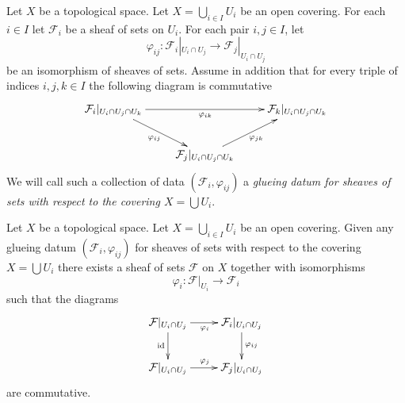 \medskip\noindent
Let $X$ be a topological space.
Let $X = \bigcup_{i\in I} U_i$ be an open covering.
For each $i \in I$ let $\mathcal{F}_i$ be a sheaf of sets on $U_i$.
For each pair $i, j \in I$, let
$$
\varphi_{ij} :
\mathcal{F}_i|_{U_i \cap U_j}
\longrightarrow
\mathcal{F}_j|_{U_i \cap U_j}
$$
be an isomorphism of sheaves of sets. Assume in addition
that for every triple of indices $i, j, k \in I$ the
following diagram is commutative
$$
\xymatrix{
\mathcal{F}_i|_{U_i \cap U_j \cap U_k}
\ar[rr]_{\varphi_{ik}}
\ar[rd]_{\varphi_{ij}} & &
\mathcal{F}_k|_{U_i \cap U_j \cap U_k} \\
&
\mathcal{F}_j|_{U_i \cap U_j \cap U_k}
\ar[ru]_{\varphi_{jk}}
}
$$
We will call such a collection of data
$(\mathcal{F}_i, \varphi_{ij})$
a {\it glueing datum for sheaves of sets with respect to
the covering $X = \bigcup U_i$}.

\begin{lemma}
\label{lemma-glue-sheaves}
Let $X$ be a topological space.
Let $X = \bigcup_{i\in I} U_i$ be an open covering.
Given any glueing datum $(\mathcal{F}_i, \varphi_{ij})$
for sheaves of sets with respect to the covering $X = \bigcup U_i$
there exists a sheaf of sets $\mathcal{F}$ on $X$
together with isomorphisms
$$
\varphi_i : \mathcal{F}|_{U_i} \to \mathcal{F}_i
$$
such that the diagrams
$$
\xymatrix{
\mathcal{F}|_{U_i \cap U_j} \ar[r]_{\varphi_i} \ar[d]_{\text{id}} &
\mathcal{F}_i|_{U_i \cap U_j} \ar[d]^{\varphi_{ij}} \\
\mathcal{F}|_{U_i \cap U_j} \ar[r]^{\varphi_j} &
\mathcal{F}_j|_{U_i \cap U_j}
}
$$
are commutative.
\end{lemma}

